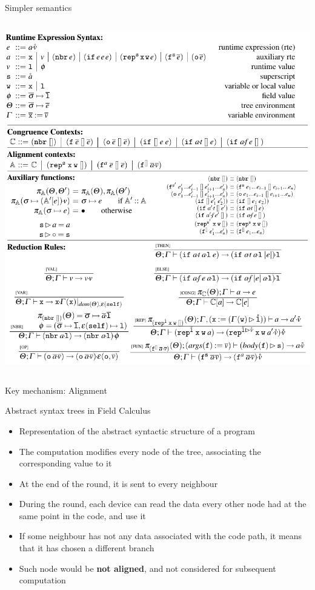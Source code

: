 \documentclass[presentation]{beamer}\mode<presentation>{\usetheme{sapere}}
\begin{document}
\begin{frame}[fragile]{Simpler semantics}
\begin{columns}
\begin{column}{6cm}
\begin{framed}
        \includegraphics[width=1.015\columnwidth]{imgs/fcsem}
      \end{framed}
   \end{column}
  \end{columns}
\end{frame}

\begin{frame}{Key mechanism: Alignment}
  \begin{block} {Abstract syntax trees in Field Calculus}
   \begin{itemize}
    \item Representation of the abstract syntactic structure of a program
    \item The computation modifies every node of the tree, associating the corresponding value to it
    \item At the end of the round, it is sent to every neighbour
    \item During the round, each device can read the data every other node had at the same point in the code, and use it
    \item If some neighbour has not any data associated with the code path, it means that it has chosen a different branch
    \item Such node would be \textbf{not aligned}, and not considered for subsequent computation
   \end{itemize}
  \end{block}
\end{frame}
\end{document}
